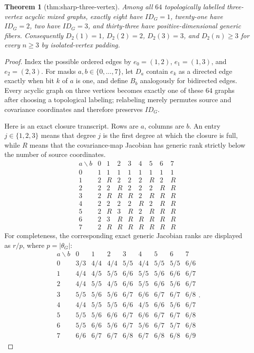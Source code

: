 \documentclass{article}
\newtheorem{theorem}{Theorem}
\begin{document}
\begin{theorem}[thm:sharp-three-vertex]\label{thm:sharp-three-vertex}
Among all \(64\) topologically labelled three-vertex acyclic mixed graphs, exactly eight have \(ID_G=1\), twenty-one have \(ID_G=2\), two have \(ID_G=3\), and thirty-three have positive-dimensional generic fibers. Consequently \(D_2(1)=1\), \(D_2(2)=2\), \(D_2(3)=3\), and \(D_2(n)\ge3\) for every \(n\ge3\) by isolated-vertex padding.
\end{theorem}
\begin{proof}
Index the possible ordered edges by \(e_0=(1,2)\), \(e_1=(1,3)\), and \(e_2=(2,3)\).  For masks \(a,b\in\{0,\ldots,7\}\), let \(D_a\) contain \(e_k\) as a directed edge exactly when bit \(k\) of \(a\) is one, and define \(B_b\) analogously for bidirected edges.  Every acyclic graph on three vertices becomes exactly one of these \(64\) graphs after choosing a topological labeling; relabeling merely permutes source and covariance coordinates and therefore preserves \(ID_G\).

Here is an exact closure transcript.  Rows are \(a\), columns are \(b\).  An entry \(j\in\{1,2,3\}\) means that degree \(j\) is the first degree at which the closure is full, while \(R\) means that the covariance-map Jacobian has generic rank strictly below the number of source coordinates.
\[
\begin{array}{c|cccccccc}
 a\backslash b&0&1&2&3&4&5&6&7\\ \hline
0&1&1&1&1&1&1&1&1\\
1&2&R&2&2&2&R&2&R\\
2&2&2&R&2&2&2&R&R\\
3&2&R&R&R&2&R&R&R\\
4&2&2&2&2&R&2&R&R\\
5&2&R&3&R&2&R&R&R\\
6&2&3&R&R&R&R&R&R\\
7&2&R&R&R&R&R&R&R
\end{array} \tag{2}
\]
For completeness, the corresponding exact generic Jacobian ranks are displayed as \(r/p\), where \(p=|\theta_G|\):
\[
\begin{array}{c|cccccccc}
 a\backslash b&0&1&2&3&4&5&6&7\\ \hline
0&3/3&4/4&4/4&5/5&4/4&5/5&5/5&6/6\\
1&4/4&4/5&5/5&6/6&5/5&5/6&6/6&6/7\\
2&4/4&5/5&4/5&6/6&5/5&6/6&5/6&6/7\\
3&5/5&5/6&5/6&6/7&6/6&6/7&6/7&6/8\\
4&4/4&5/5&5/5&6/6&4/5&6/6&5/6&6/7\\
5&5/5&5/6&6/6&6/7&6/6&6/7&6/7&6/8\\
6&5/5&6/6&5/6&6/7&5/6&6/7&5/7&6/8\\
7&6/6&6/7&6/7&6/8&6/7&6/8&6/8&6/9
\end{array}. \tag{3}
\]


\end{proof}
\end{document}

